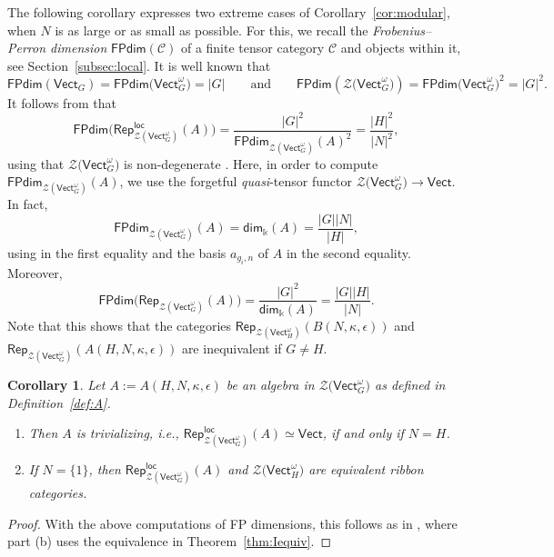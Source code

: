 \documentclass[10pt,a4paper]{amsart}
\numberwithin{equation}{section}
\newtheorem{Corollary}[Theorem]{Corollary}
\newcommand{\FPdim}{\mathsf{FPdim}}
\renewcommand{\dim}{\mathsf{dim}}
\newcommand{\Rep}{\mathsf{Rep}}
\newcommand{\locmod}{\mathsf{Rep}^{\mathsf{loc}}}
\newcommand{\Vect}{\mathsf{Vect}}
\newcommand{\cC}{\mathcal{C}}
\newcommand{\cZ}{\mathcal{Z}}
\begin{document}
The following corollary expresses two extreme cases of Corollary~\ref{cor:modular}, when $N$ is as large or as small as possible. For this, we recall the \emph{Frobenius--Perron dimension} $\FPdim(\cC)$ of a finite tensor category $\cC$ \cite[Section~4.5]{EGNO} and objects within it, see Section~\ref{subsec:local}. It is well known that
\[\FPdim(\Vect_G)=\FPdim\big(\Vect_G^\omega\big)=|G| \qquad \text{and} \qquad \FPdim(\cZ\big(\Vect_G^\omega\big))=\FPdim\big(\Vect_G^\omega\big)^2=|G|^2.\]
It follows from \cite[Corollary 4.21]{LW3} that
\[\FPdim \big(\locmod_{\cZ(\Vect_G^\omega)}(A)\big)=\frac{|G|^2}{\FPdim_{\cZ(\Vect_G^\omega)}(A)^2}= \frac{|H|^2}{|N|^2},\]
using that $\cZ\big(\Vect_G^\omega\big)$ is non-degenerate \cite[Proposition~8.6.3]{EGNO}. Here, in order to compute $\FPdim_{\cZ(\Vect_G^\omega)}(A)$, we use the forgetful \emph{quasi}-tensor functor $\cZ\big(\Vect_G^\omega\big)\to \Vect$. In fact, \[\FPdim_{\cZ(\Vect_G^\omega)}(A)=\dim_\Bbbk (A)=\frac{|G||N|}{|H|},\]
using \cite[Proposition~4.5.7]{EGNO} in the first equality and the basis $a_{g_i,n}$ of $A$ in the second equality.
Moreover,
\[\FPdim \big(\Rep_{\cZ(\Vect_G^\omega)}(A)\big)=\frac{|G|^2}{\dim_\Bbbk(A)}=\frac{|G||H|}{|N|}.\]
Note that this shows that the categories
$\Rep_{\cZ(\Vect^\omega_H)}(B(N,\kappa,\epsilon))$ and $\Rep_{\cZ(\Vect^\omega_G)}(A(H,N,\kappa,\epsilon))$ are inequivalent if $G\neq H$.

\begin{Corollary} %
Let $A:=A(H,N,\kappa,\epsilon)$ be an algebra in $\cZ\big(\Vect_G^\omega\big)$ as defined in Definition~{\rm \ref{def:A}}.
\begin{enumerate}\itemsep=0pt
\item[$(a)$] Then $A$ is \emph{trivializing}, i.e., $\locmod_{\cZ(\Vect_{G}^\omega)}(A)\simeq \Vect$, if and only if $N=H$.
\item[$(b)$] If $N=\{1\}$, then $\locmod_{\cZ(\Vect_G^\omega)}(A)$ and $\cZ\big(\Vect_H^\omega\big)$ are equivalent ribbon categories.
\end{enumerate}
\end{Corollary}
\begin{proof}
With the above computations of FP dimensions, this follows as in \cite[Corollary~6.18]{LW3}, where part (b) uses the equivalence in Theorem~\ref{thm:Iequiv}.
\end{proof}
\end{document}
